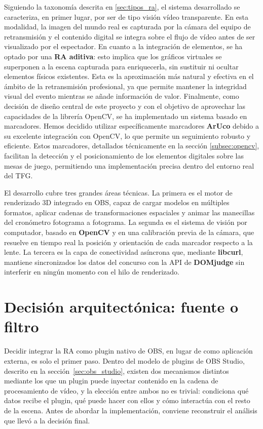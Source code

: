 Siguiendo la taxonomía descrita en \ref{sec:tipos_ra}, el sistema desarrollado se caracteriza, en primer lugar, por ser de tipo visión vídeo transparente. En esta modalidad, la imagen del mundo real es capturada por la cámara del equipo de retransmisión y el contenido digital se integra sobre el flujo de vídeo antes de ser visualizado por el espectador. En cuanto a la integración de elementos, se ha optado por una \textbf{RA aditiva}: esto implica que los gráficos virtuales se superponen a la escena capturada para enriquecerla, sin sustituir ni ocultar elementos físicos existentes. Esta es la aproximación más natural y efectiva en el ámbito de la retransmisión profesional, ya que permite mantener la integridad visual del evento mientras se añade información de valor.
Finalmente, como decisión de diseño central de este proyecto y con el objetivo de aprovechar las capacidades de la librería OpenCV, se ha implementado un sistema  basado en marcadores. Hemos decidido utilizar específicamente marcadores \textbf{ArUco} debido a su excelente integración con OpenCV, lo que permite un seguimiento robusto y eficiente. Estos marcadores, detallados técnicamente en la sección \ref{subsec:opencv}, facilitan la detección y el posicionamiento de los elementos digitales sobre las mesas de juego, permitiendo una implementación precisa dentro del entorno real del TFG.

El desarrollo cubre tres grandes áreas técnicas. La primera es el motor de renderizado 3D integrado en OBS, capaz de cargar modelos en múltiples formatos, aplicar cadenas de transformaciones espaciales y animar las manecillas del cronómetro fotograma a fotograma. La segunda es el sistema de visión por computador, basado en \textbf{OpenCV} y en una calibración previa de la cámara, que resuelve en tiempo real la posición y orientación de cada marcador respecto a la lente. La tercera es la capa de conectividad asíncrona que, mediante \textbf{libcurl}, mantiene sincronizados los datos del concurso con la API de \textbf{DOMjudge} sin interferir en ningún momento con el hilo de renderizado.

\section{Decisión arquitectónica: fuente o filtro}
\label{sec:decision_fuente_filtro}

Decidir integrar la RA como plugin nativo de OBS, en lugar de como aplicación externa, es solo el primer paso. Dentro del modelo de plugins de OBS Studio, descrito en la sección~\ref{sec:obs_studio}, existen dos mecanismos distintos mediante los que un plugin puede inyectar contenido en la cadena de procesamiento de vídeo, y la elección entre ambos no es trivial: condiciona qué datos recibe el plugin, qué puede hacer con ellos y cómo interactúa con el resto de la escena. Antes de abordar la implementación, conviene reconstruir el análisis que llevó a la decisión final.

